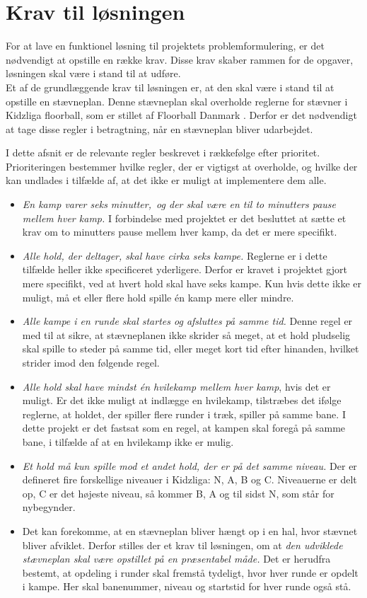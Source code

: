 \section{Krav til løsningen}\label{afsnit:krav}
For at lave en funktionel løsning til projektets problemformulering, er det nødvendigt at opstille en række krav. Disse krav skaber rammen for de opgaver, løsningen skal være i stand til at udføre.\\
Et af de grundlæggende krav til løsningen er, at den skal være i stand til at opstille en stævneplan. Denne stævneplan skal overholde reglerne for stævner i Kidzliga floorball, som er stillet af Floorball Danmark \cite{kidzRegler}. Derfor er det nødvendigt at tage disse regler i betragtning, når en stævneplan bliver udarbejdet.
\par
I dette afsnit er de relevante regler beskrevet i rækkefølge efter prioritet. Prioriteringen bestemmer hvilke regler, der er vigtigst at overholde, og hvilke der kan undlades i tilfælde af, at det ikke er muligt at implementere dem alle.
\begin{itemize}
    \item \textit{En kamp varer seks minutter,\ og der skal være en til to minutters pause mellem hver kamp.} I forbindelse med projektet er det besluttet at sætte et krav om to minutters pause mellem hver kamp, da det er mere specifikt.
    \item \textit{Alle hold, der deltager, skal have cirka seks kampe.} Reglerne er i dette tilfælde heller ikke specificeret yderligere. Derfor er kravet i projektet gjort mere specifikt, ved at hvert hold skal have seks kampe. Kun hvis dette ikke er muligt, må et eller flere hold spille én kamp mere eller mindre. 
    \item \textit{Alle kampe i en runde skal startes og afsluttes på samme tid.} Denne regel er med til at sikre, at stævneplanen ikke skrider så meget, at et hold pludselig skal spille to steder på samme tid, eller meget kort tid efter hinanden, hvilket strider imod den følgende regel.
    \item \textit{Alle hold skal have mindst én hvilekamp mellem hver kamp}, hvis det er muligt. Er det ikke muligt at indlægge en hvilekamp, tilstræbes det ifølge reglerne, at holdet, der spiller flere runder i træk, spiller på samme bane. I dette projekt er det fastsat som en regel, at kampen skal foregå på samme bane, i tilfælde af at en hvilekamp ikke er mulig. 
    \item \textit{Et hold må kun spille mod et andet hold, der er på det samme niveau.} Der er defineret fire forskellige niveauer i Kidzliga: N, A, B og C. Niveauerne er delt op, C er det højeste niveau, så kommer B, A og til sidst N, som står for nybegynder. 
    \item Det kan forekomme, at en stævneplan bliver hængt op i en hal, hvor stævnet bliver afviklet. Derfor stilles der et krav til løsningen, om at \textit{den udviklede stævneplan skal være opstillet på en præsentabel måde.} Det er herudfra bestemt, at opdeling i runder skal fremstå tydeligt, hvor hver runde er opdelt i kampe. Her skal banenummer, niveau og startstid for hver runde også stå.
\end{itemize} 

